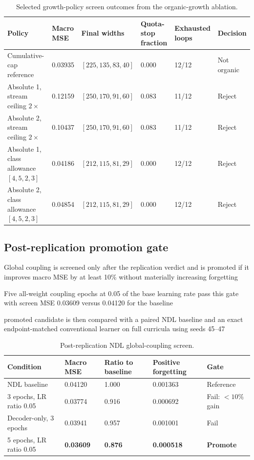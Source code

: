 \begin{table}[htbp]
\centering
\caption{Selected growth-policy screen outcomes from the organic-growth ablation.}
\label{tab:organic-growth-screen}
\scriptsize
\begin{tabularx}{\textwidth}{Yp{1.5cm}p{2.4cm}p{1.8cm}p{1.8cm}p{1.8cm}}
\toprule
Policy & Macro MSE & Final widths & Quota-stop fraction & Exhausted loops & Decision \\
\midrule
Cumulative-cap reference & 0.03935 & $[225,135,83,40]$ & 0.000 & 12/12 & Not organic \\
Absolute 1, stream ceiling $2\times$ & 0.12159 & $[250,170,91,60]$ & 0.083 & 11/12 & Reject \\
Absolute 2, stream ceiling $2\times$ & 0.10437 & $[250,170,91,60]$ & 0.083 & 11/12 & Reject \\
Absolute 1, class allowance $[4,5,2,3]$ & 0.04186 & $[212,115,81,29]$ & 0.000 & 12/12 & Reject \\
Absolute 2, class allowance $[4,5,2,3]$ & 0.04854 & $[212,115,81,29]$ & 0.000 & 12/12 & Reject \\
\bottomrule
\end{tabularx}
\end{table}

\subsection{Post-replication promotion gate}
\begin{draftpoints}
  \item Global coupling is screened only after the replication verdict and is promoted if it improves macro MSE by at least 10\% without materially increasing forgetting
  \item Five all-weight coupling epochs at 0.05 of the base learning rate pass this gate with screen MSE 0.03609 versus 0.04120 for the baseline
  \item promoted candidate is then compared with a paired NDL baseline and an exact endpoint-matched conventional learner on full curricula using seeds 45--47
\end{draftpoints}

\begin{table}[htbp]
\centering
\caption{Post-replication NDL global-coupling screen.}
\label{tab:coupling-screen}
\small
\begin{tabularx}{\textwidth}{Yp{2.0cm}p{2.0cm}p{2.2cm}p{2.1cm}}
\toprule
Condition & Macro MSE & Ratio to baseline & Positive forgetting & Gate \\
\midrule
NDL baseline & 0.04120 & 1.000 & 0.001363 & Reference \\
3 epochs, LR ratio 0.05 & 0.03774 & 0.916 & 0.000692 & Fail: $<10\%$ gain \\
Decoder-only, 3 epochs & 0.03941 & 0.957 & 0.001001 & Fail \\
5 epochs, LR ratio 0.05 & \textbf{0.03609} & \textbf{0.876} & \textbf{0.000518} & \textbf{Promote} \\
\bottomrule
\end{tabularx}
\end{table}
